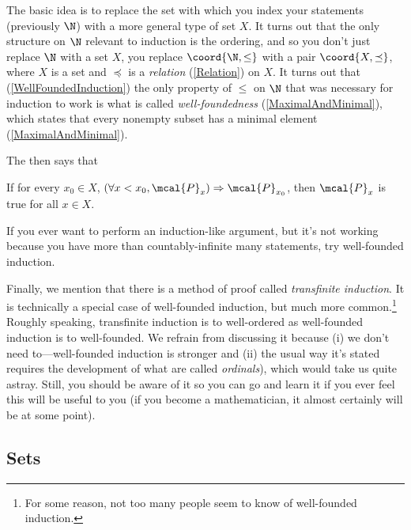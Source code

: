 The basic idea is to replace the set with which you index your statements (previously $\N$) with a more general type of set $X$.  It turns out that the only structure on $\N$ relevant to induction is the ordering, and so you don't just replace $\N$ with a set $X$, you replace $\coord{\N ,\leq}$ with a pair $\coord{X,\preceq}$, where $X$ is a set and $\preceq$ is a \emph{relation} (\cref{Relation}) on $X$.  It turns out that (\cref{WellFoundedInduction}) the only property of $\leq$ on $\N$ that was necessary for induction to work is what is called \emph{well-foundedness} (\cref{MaximalAndMinimal}), which states that every nonempty subset has a minimal element (\cref{MaximalAndMinimal}).

The  then says that
\begin{displayquote}
	If for every $x_0\in X$, $(\forall x<x_0,\mcal{P}_x)\Rightarrow \mcal{P}_{x_0}$, then $\mcal{P}_x$ is true for all $x\in X$.
\end{displayquote}

If you ever want to perform an induction-like argument, but it's not working because you have more than countably-infinite many statements, try well-founded induction.

Finally, we mention that there is a method of proof called \emph{transfinite induction}.  It is technically a special case of well-founded induction, but much more common.\footnote{For some reason, not too many people seem to know of well-founded induction.}  Roughly speaking, transfinite induction is to well-ordered as well-founded induction is to well-founded.  We refrain from discussing it because (i) we don't need to---well-founded induction is stronger and (ii) the usual way it's stated requires the development of what are called \emph{ordinals}), which would take us quite astray.  Still, you should be aware of it so you can go and learn it if you ever feel this will be useful to you (if you become a mathematician, it almost certainly will be at some point).

\subsection{Sets}\label{sbsSets}


